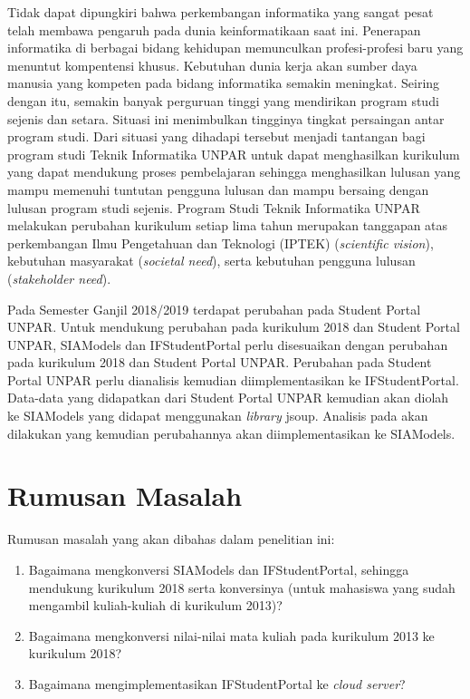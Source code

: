 Tidak dapat dipungkiri bahwa perkembangan informatika yang sangat pesat telah membawa pengaruh pada dunia keinformatikaan saat ini. Penerapan informatika di berbagai bidang kehidupan memunculkan profesi-profesi baru yang menuntut kompentensi khusus. Kebutuhan dunia kerja akan sumber daya manusia yang kompeten pada bidang informatika semakin meningkat. Seiring dengan itu, semakin banyak perguruan tinggi yang mendirikan program studi sejenis dan setara. Situasi ini menimbulkan tingginya tingkat persaingan antar program studi. Dari situasi yang dihadapi tersebut menjadi tantangan bagi program studi Teknik Informatika UNPAR untuk dapat menghasilkan kurikulum yang dapat mendukung proses pembelajaran sehingga menghasilkan lulusan yang mampu memenuhi tuntutan pengguna lulusan dan mampu bersaing dengan lulusan program studi sejenis. Program Studi Teknik Informatika UNPAR melakukan perubahan kurikulum setiap lima tahun merupakan tanggapan atas perkembangan Ilmu Pengetahuan dan Teknologi (IPTEK) (\textit{scientific vision}), kebutuhan masyarakat (\textit{societal need}), serta kebutuhan pengguna lulusan (\textit{stakeholder need}).

Pada Semester Ganjil 2018/2019 terdapat perubahan pada Student Portal UNPAR. Untuk mendukung perubahan pada kurikulum 2018 dan Student Portal UNPAR, SIAModels dan IFStudentPortal perlu disesuaikan dengan perubahan pada kurikulum 2018 dan Student Portal UNPAR. Perubahan pada Student Portal UNPAR perlu dianalisis kemudian diimplementasikan ke IFStudentPortal. Data-data yang didapatkan dari Student Portal UNPAR kemudian akan diolah ke SIAModels yang didapat menggunakan \textit{library} jsoup. Analisis pada \cite{dokumenkurikulum2018} akan dilakukan yang kemudian perubahannya akan diimplementasikan ke SIAModels.

\section{Rumusan Masalah}
\label{sec:rumusan}
Rumusan masalah yang akan dibahas dalam penelitian ini:
\begin{enumerate}
	\item Bagaimana mengkonversi SIAModels dan IFStudentPortal, sehingga mendukung kurikulum 2018 serta konversinya (untuk mahasiswa yang sudah mengambil kuliah-kuliah di kurikulum 2013)?
	\item Bagaimana mengkonversi nilai-nilai mata kuliah pada kurikulum 2013 ke kurikulum 2018?
	\item Bagaimana mengimplementasikan IFStudentPortal ke \textit{cloud server}?
\end{enumerate}


